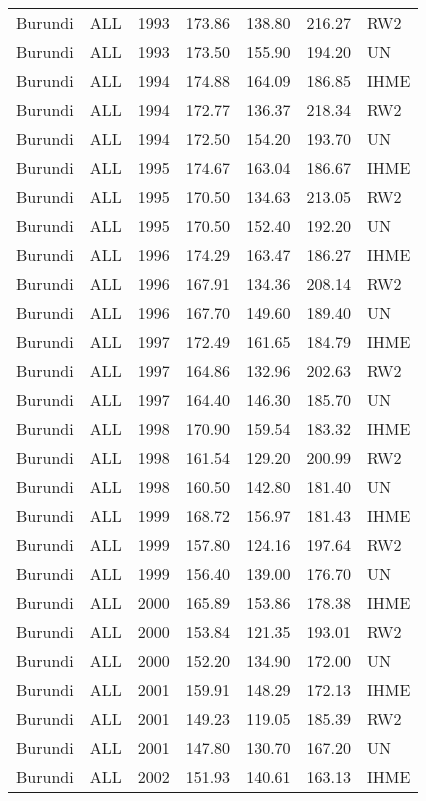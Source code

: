 \begin{longtable}{lllrrrl}
  Burundi & ALL & 1993 & 173.86 & 138.80 & 216.27 & RW2 \\ 
  Burundi & ALL & 1993 & 173.50 & 155.90 & 194.20 & UN \\ 
  Burundi & ALL & 1994 & 174.88 & 164.09 & 186.85 & IHME \\ 
  Burundi & ALL & 1994 & 172.77 & 136.37 & 218.34 & RW2 \\ 
  Burundi & ALL & 1994 & 172.50 & 154.20 & 193.70 & UN \\ 
  Burundi & ALL & 1995 & 174.67 & 163.04 & 186.67 & IHME \\ 
  Burundi & ALL & 1995 & 170.50 & 134.63 & 213.05 & RW2 \\ 
  Burundi & ALL & 1995 & 170.50 & 152.40 & 192.20 & UN \\ 
  Burundi & ALL & 1996 & 174.29 & 163.47 & 186.27 & IHME \\ 
  Burundi & ALL & 1996 & 167.91 & 134.36 & 208.14 & RW2 \\ 
  Burundi & ALL & 1996 & 167.70 & 149.60 & 189.40 & UN \\ 
  Burundi & ALL & 1997 & 172.49 & 161.65 & 184.79 & IHME \\ 
  Burundi & ALL & 1997 & 164.86 & 132.96 & 202.63 & RW2 \\ 
  Burundi & ALL & 1997 & 164.40 & 146.30 & 185.70 & UN \\ 
  Burundi & ALL & 1998 & 170.90 & 159.54 & 183.32 & IHME \\ 
  Burundi & ALL & 1998 & 161.54 & 129.20 & 200.99 & RW2 \\ 
  Burundi & ALL & 1998 & 160.50 & 142.80 & 181.40 & UN \\ 
  Burundi & ALL & 1999 & 168.72 & 156.97 & 181.43 & IHME \\ 
  Burundi & ALL & 1999 & 157.80 & 124.16 & 197.64 & RW2 \\ 
  Burundi & ALL & 1999 & 156.40 & 139.00 & 176.70 & UN \\ 
  Burundi & ALL & 2000 & 165.89 & 153.86 & 178.38 & IHME \\ 
  Burundi & ALL & 2000 & 153.84 & 121.35 & 193.01 & RW2 \\ 
  Burundi & ALL & 2000 & 152.20 & 134.90 & 172.00 & UN \\ 
  Burundi & ALL & 2001 & 159.91 & 148.29 & 172.13 & IHME \\ 
  Burundi & ALL & 2001 & 149.23 & 119.05 & 185.39 & RW2 \\ 
  Burundi & ALL & 2001 & 147.80 & 130.70 & 167.20 & UN \\ 
  Burundi & ALL & 2002 & 151.93 & 140.61 & 163.13 & IHME \\ 

\end{longtable}
